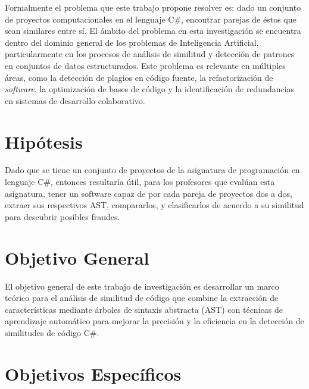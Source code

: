 Formalmente el problema que este trabajo propone resolver es: dado un conjunto de proyectos computacionales en el lenguaje C\#, encontrar parejas de éstos que sean similares entre sí. El ámbito del problema en esta investigación se encuentra dentro del dominio general de los problemas de Inteligencia Artificial, particularmente en los procesos de análisis de similitud y detección de patrones en conjuntos de datos estructurados. Este problema es relevante en múltiples áreas, como la detección de plagios en código fuente, la refactorización de \textit{software}, la optimización de bases de código y la identificación de redundancias en sistemas de desarrollo colaborativo.

\section*{Hipótesis}

Dado que se tiene un conjunto de proyectos de la asignatura de programación en lenguaje C\#, entonces resultaría útil, para los profesores que evalúan esta asignatura, tener un software capaz de por cada pareja de proyectos dos a dos, extraer sus respectivos AST, compararlos, y clasificarlos de acuerdo a su similitud para descubrir posibles fraudes.

\section*{Objetivo General} 

El objetivo general de este trabajo de investigación es desarrollar un marco teórico para el análisis de similitud de código que combine la extracción de características mediante árboles de sintaxis abstracta (AST) con técnicas de aprendizaje automático para mejorar la precisión y la eficiencia en la detección de similitudes de c\'odigo C\#.

 
\section*{Objetivos Específicos}

